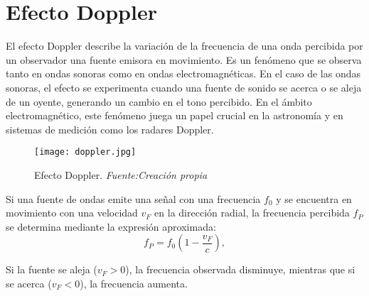 \section{Efecto Doppler}
El efecto Doppler describe la variación de la frecuencia de una onda percibida por un observador una fuente emisora en movimiento. Es un fenómeno que se observa tanto en ondas sonoras como en ondas electromagnéticas. En el caso de las ondas sonoras, el efecto se experimenta cuando una fuente de sonido se acerca o se aleja de un oyente, generando un cambio en el tono percibido. En el ámbito electromagnético, este fenómeno juega un papel crucial en la astronomía y en sistemas de medición como los radares Doppler.

\begin{figure}[H]
    \centering
    \texttt{[image: doppler.jpg]}
    \caption{\centering Efecto Doppler. \textit{ Fuente:Creación propia}}
    \label{fig:mi-imagen17}
\end{figure}

Si una fuente de ondas emite una señal con una frecuencia $f_0$ y se encuentra en movimiento con una velocidad $v_F$ en la dirección radial, la frecuencia percibida $f_P$ se determina mediante la expresión aproximada:
\begin{equation}
    f_P = f_0 \left( 1 - \frac{v_F}{c} \right),
\end{equation}

Si la fuente se aleja ($v_F > 0$), la frecuencia observada disminuye, mientras que si se acerca ($v_F < 0$), la frecuencia aumenta.